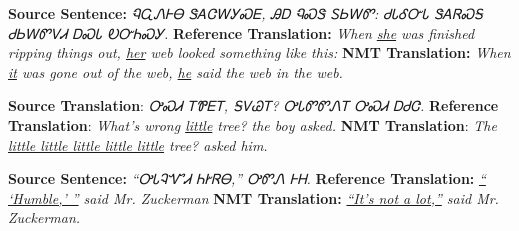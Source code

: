 \begin{parts}
    \begin{subparts}
        \subpart[2]
        \textbf{Source Sentence:} \textit{{\cherokeefam ᏄᏩᏁᎰᎾ ᏕᎪᏣᎳᎩᏍᎬ, ᎯᎠ ᏄᏍᏕ ᏚᏏᎳᏛ: ᏧᏓᎴᏅᏓ ᏕᎪᏒᏍᎦ ᏧᏏᎳᏛᏙᏗ ᎠᏍᏓ ᎧᏅᏂᏍᎩ.        }}\newline
        \textbf{Reference Translation:} \textit{When \underline{she} was finished ripping things out, \underline{her} web looked something like this: }\newline
        \textbf{NMT Translation:} \textit{When \underline{it} was gone out of the web, \underline{he} said the web in the web.}
        
        \subpart[2]
        \textbf{Source Translation}: \textit{{\cherokeefam ᎤᏍᏗ ᎢᏈᎬᎢ, ᎦᏙᏊᎢ? ᎤᏓᏛᏛᏁᎢ ᎤᏍᏗ ᎠᏧᏣ.}}\newline
        \textbf{Reference Translation}: \textit{What's wrong \underline{little} tree? the boy asked.}\newline
        \textbf{NMT Translation}: \textit{ The \underline{little little little little little} tree? asked him.}
        
        \subpart[2] 
        \textbf{Source Sentence:} \textit{{\cherokeefam “ᎤᏓᎸᏉᏗ ᏂᎨᏒᎾ,” ᎤᏛᏁ ᎰᎻ.}}\newline
        \textbf{Reference Translation:} \textit{\underline{“ ‘Humble,’ ”} said Mr. Zuckerman}\newline
        \textbf{NMT Translation:} \textit{\underline{“It’s not a lot,”} said Mr. Zuckerman.}
    \end{subparts}
    

\end{parts}
